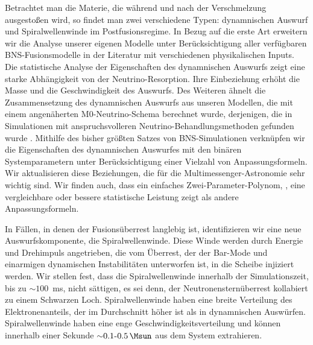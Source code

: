 Betrachtet man die Materie, die während und nach der Verschmelzung ausgestoßen wird, so findet man 
zwei verschiedene Typen: dynamnischen Auswurf und Spiralwellenwinde im Postfusionsregime. 
In Bezug auf die erste Art 
erweitern wir die Analyse unserer eigenen Modelle unter Berücksichtigung aller 
verfügbaren BNS-Fusionsmodelle in der Literatur mit verschiedenen physikalischen Inputs. 
Die statistische Analyse der Eigenschaften des dynamnischen Auswurfs zeigt eine starke 
Abhängigkeit von der Neutrino-Resorption. 
Ihre Einbeziehung erhöht die Masse und die Geschwindigkeit des Auswurfs. 
Des Weiteren ähnelt die Zusammensetzung des dynamnischen Auswurfs  
aus unseren Modellen, die mit einem angenäherten M0-Neutrino-Schema berechnet wurde, derjenigen, die in Simulationen mit anspruchsvolleren Neutrino-Behandlungsmethoden gefunden wurde \citep{Sekiguchi:2016bjd,Vincent:2019kor}. 
Mithilfe des bisher größten Satzes von BNS-Simulationen verknüpfen wir die Eigenschaften des dynamnischen Auswurfes
mit den binären Systemparametern unter Berücksichtigung einer Vielzahl von Anpassungsformeln.  
Wir aktualisieren diese Beziehungen, die für die Multimessenger-Astronomie sehr wichtig sind. 
Wir finden auch, dass ein einfaches Zwei-Parameter-Polynom, \polql{}, eine vergleichbare oder 
bessere statistische Leistung zeigt als andere Anpassungsformeln.


In Fällen, in denen der Fusionsüberrest langlebig ist, identifizieren wir eine neue Auswurfskomponente, die 
Spiralwellenwinde. Diese Winde werden durch Energie und Drehimpuls angetrieben, die vom Überrest, der der Bar-Mode und einarmigen dynamischen Instabilitäten unterworfen ist, in die Scheibe injiziert werden.
Wir stellen fest, dass  die Spiralwellenwinde innerhalb der Simulationszeit, bis zu ${\sim}100$~ms, nicht 
sättigen, es sei denn, der Neutronensternüberrest kollabiert zu einem Schwarzen Loch.
Spiralwellenwinde haben eine breite Verteilung des Elektronenanteils, der im Durchschnitt höher ist
als in dynamnischen Auswürfen. 
Spiralwellenwinde haben eine enge Geschwindigkeitsverteilung und können innerhalb einer Sekunde
${\sim}0.1\textsc{-}0.5\, \Msun$ aus dem System extrahieren.

